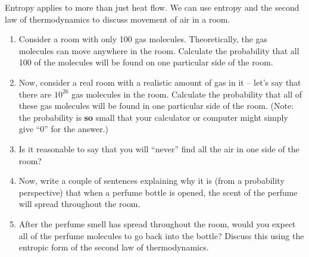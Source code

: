 
\begin{problem}
Entropy applies to more than just heat flow.  We can use entropy
and the second law of thermodynamics to discuss movement of
air in a room.
\begin{enumerate}
\item Consider a room with only 100 gas molecules.  Theoretically,
the gas molecules can move anywhere in the room.  Calculate the 
probability that all 100 of the molecules will be found on
one particular side of the room.
\item Now, consider a real room with a realistic amount of gas in
it -- let's say that there are $10^{26}$ gas molecules in the room.
Calculate the probability that all of these gas molecules will
be found in one particular side of the room.  (Note:  the probability
is {\bf so} small that your calculator or computer might simply
give ``0'' for the answer.)
\item Is it reasonable to say that you will ``never'' find all the
air in one side of the room?
\item Now, write a couple of sentences explaining why it is
(from a probability perspective) that when a perfume bottle is
opened, the scent of the perfume will spread throughout
the room.  
\item After the perfume smell has spread throughout the room,
would you expect all of the perfume molecules to go back
into the bottle?  Discuss this using the entropic form of the
second law of thermodynamics.
\end{enumerate}
\end{problem}
\newpage

